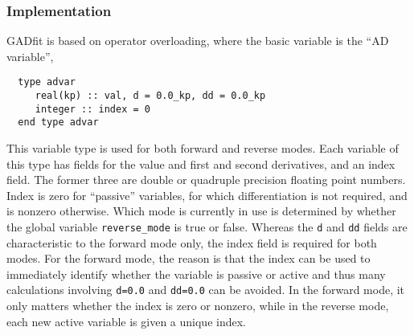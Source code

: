 \documentclass{article}
\begin{document}
\subsubsection{Implementation}

GADfit is based on operator overloading, where the basic variable is the ``AD variable'',
\begin{verbatim}
  type advar
     real(kp) :: val, d = 0.0_kp, dd = 0.0_kp
     integer :: index = 0
  end type advar
\end{verbatim}
This variable type is used for both forward and reverse modes. Each variable of this type has fields for the value and first and second derivatives, and an index field. The former three are double or quadruple precision floating point numbers. Index is zero for ``passive'' variables, for which differentiation is not required, and is nonzero otherwise. Which mode is currently in use is determined by whether the global variable \verb+reverse_mode+ is true or false. Whereas the \texttt{d} and \texttt{dd} fields are characteristic to the forward mode only, the index field is required for both modes. For the forward mode, the reason is that the index can be used to immediately identify whether the variable is passive or active and thus many calculations involving \texttt{d=0.0} and \texttt{dd=0.0} can be avoided. In the forward mode, it only matters whether the index is zero or nonzero, while in the reverse mode, each new active variable is given a unique index.
\end{document}
